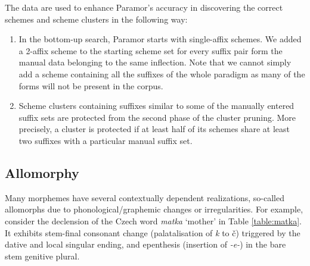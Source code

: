 \documentclass{itatnew}
\newcommand{\e}[1]{\textit{#1}} %
\newcommand{\todojd}[1]{} %
\begin{document}
\noindent
The data are used to enhance Paramor's accuracy in discovering the correct schemes and scheme clusters in the following way:
\begin{enumerate}
\item In the bottom-up search, Paramor starts with single-affix schemes. We added a 2-affix scheme to the starting scheme set for every suffix pair form the manual data belonging to the same inflection. Note that we cannot simply add a scheme containing all the suffixes of the whole paradigm as many of the forms will not be present in the corpus.
    
\item Scheme clusters containing suffixes similar to some of the manually entered suffix sets are protected from the second phase of the cluster pruning. More precisely, a cluster is protected if at least half of its schemes share at least two suffixes with a particular manual suffix set.
\todojd{Is there any reason why half and two, and not, say, 60\% and 3?  \textbf{RK:} Not really -- similar criterion is often used in Paramor so I used it here as well.}



\end{enumerate}



\subsection{Allomorphy}


\noindent
Many morphemes have several contextually dependent realizations,  so-called
allomorphs due to phonological/graphemic changes or irregularities. For example, consider the declension of the Czech word \e{matka} `mother' in Table \ref{table:matka}. It exhibits stem-final conso\-nant chan\-ge (palatalisation of \e{k} to \v{c}) triggered by the dative and local singular ending, and epenthesis (insertion of \e{-e-}) in the bare stem genitive plural.
\end{document}
